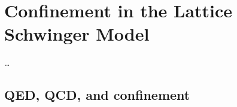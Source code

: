 \documentclass[../main.tex]{subfiles} %
\begin{document}
\chapter{Confinement in the Lattice Schwinger Model} \label{chap:Confinement}

\ldots



\section{QED, QCD, and confinement}

\lipsum[1-20]
\end{document}
